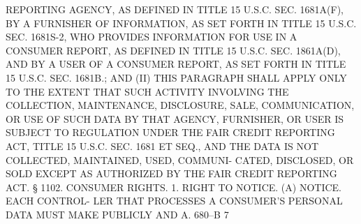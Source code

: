  REPORTING  AGENCY,  AS  DEFINED  IN  TITLE 15 U.S.C. SEC. 1681A(F), BY A
 FURNISHER OF INFORMATION, AS SET FORTH IN TITLE 15 U.S.C. SEC.  1681S-2,
 WHO PROVIDES INFORMATION FOR USE IN A CONSUMER  REPORT,  AS  DEFINED  IN
 TITLE  15  U.S.C.  SEC. 1861A(D), AND BY A USER OF A CONSUMER REPORT, AS
 SET FORTH IN TITLE 15 U.S.C. SEC. 1681B.; AND
   (II) THIS PARAGRAPH SHALL APPLY ONLY TO THE EXTENT THAT SUCH  ACTIVITY
 INVOLVING  THE COLLECTION, MAINTENANCE, DISCLOSURE, SALE, COMMUNICATION,
 OR USE OF SUCH DATA BY THAT AGENCY, FURNISHER, OR  USER  IS  SUBJECT  TO
 REGULATION  UNDER  THE  FAIR  CREDIT REPORTING ACT, TITLE 15 U.S.C. SEC.
 1681 ET SEQ., AND THE DATA IS NOT COLLECTED, MAINTAINED, USED,  COMMUNI-
 CATED,  DISCLOSED,  OR  SOLD  EXCEPT  AS  AUTHORIZED  BY THE FAIR CREDIT
 REPORTING ACT.
   § 1102. CONSUMER RIGHTS. 1. RIGHT TO NOTICE. (A) NOTICE. EACH CONTROL-
 LER THAT PROCESSES A CONSUMER'S PERSONAL DATA  MUST  MAKE  PUBLICLY  AND
 A. 680--B                           7
 
